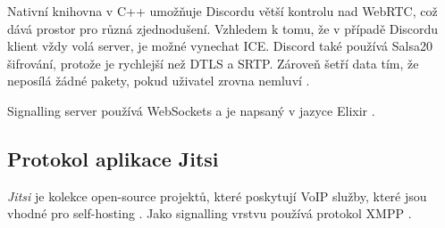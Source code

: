 Nativní knihovna v C++ umožňuje Discordu větší kontrolu nad WebRTC, což dává
prostor pro různá zjednodušení. Vzhledem k tomu, že v případě Discordu klient
vždy volá server, je možné vynechat ICE. Discord také používá Salsa20 šifrování,
protože je rychlejší než DTLS a SRTP. Zároveň šetří data tím, že neposílá žádné
pakety, pokud uživatel zrovna nemluví
\parencite{Discord-HowDoesItHandleMillionsOfUsers}.

Signalling server používá WebSockets a je napsaný v jazyce Elixir
\parencite{Discord-HowDoesItHandleMillionsOfUsers}.

\subsection{Protokol aplikace Jitsi}

\textit{Jitsi} je kolekce open-source projektů, které poskytují VoIP služby,
které jsou vhodné pro self-hosting \parencite{Jitsi-Docs-Introduction}. Jako
signalling vrstvu používá protokol XMPP \parencite{XMPPORG-WebRTC}.
